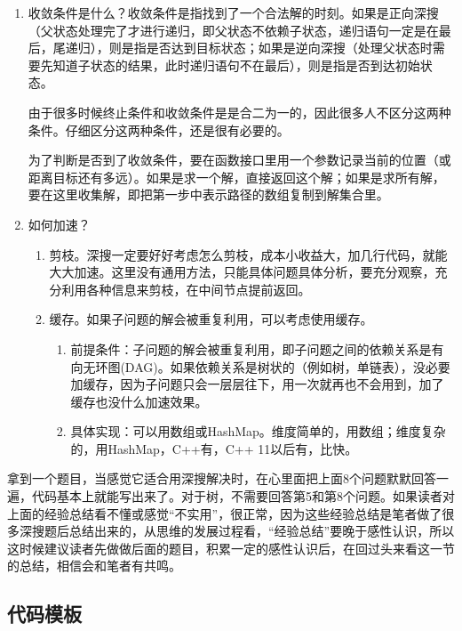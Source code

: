 \begin{enumerate}
\item {收敛条件是什么？收敛条件是指找到了一个合法解的时刻。如果是正向深搜（父状态处理完了才进行递归，即父状态不依赖子状态，递归语句一定是在最后，尾递归），则是指是否达到目标状态；如果是逆向深搜（处理父状态时需要先知道子状态的结果，此时递归语句不在最后），则是指是否到达初始状态。

由于很多时候终止条件和收敛条件是是合二为一的，因此很多人不区分这两种条件。仔细区分这两种条件，还是很有必要的。

为了判断是否到了收敛条件，要在函数接口里用一个参数记录当前的位置（或距离目标还有多远）。如果是求一个解，直接返回这个解；如果是求所有解，要在这里收集解，即把第一步中表示路径的数组复制到解集合里。}

\item 如何加速？
    \begin{enumerate}
    \item 剪枝。深搜一定要好好考虑怎么剪枝，成本小收益大，加几行代码，就能大大加速。这里没有通用方法，只能具体问题具体分析，要充分观察，充分利用各种信息来剪枝，在中间节点提前返回。
    \item 缓存。如果子问题的解会被重复利用，可以考虑使用缓存。
        \begin{enumerate}
            \item 前提条件：子问题的解会被重复利用，即子问题之间的依赖关系是有向无环图(DAG)。如果依赖关系是树状的（例如树，单链表），没必要加缓存，因为子问题只会一层层往下，用一次就再也不会用到，加了缓存也没什么加速效果。
            \item 具体实现：可以用数组或HashMap。维度简单的，用数组；维度复杂的，用HashMap，C++有，C++ 11以后有，比快。
        \end{enumerate}
    
    \end{enumerate}
\end{enumerate}

拿到一个题目，当感觉它适合用深搜解决时，在心里面把上面8个问题默默回答一遍，代码基本上就能写出来了。对于树，不需要回答第5和第8个问题。如果读者对上面的经验总结看不懂或感觉“不实用”，很正常，因为这些经验总结是笔者做了很多深搜题后总结出来的，从思维的发展过程看，“经验总结”要晚于感性认识，所以这时候建议读者先做做后面的题目，积累一定的感性认识后，在回过头来看这一节的总结，相信会和笔者有共鸣。


\subsection{代码模板}

